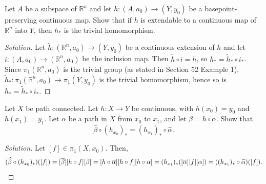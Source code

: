 \documentclass[10pt]{article}
\providecommand{\ol}{\overline}
\providecommand{\RR}{\mathbb R}
\newenvironment{soln}{\begin{proof}[Solution]}{\end{proof}}
\begin{document}
\begin{problem}
    [Munkres 52.5]
    Let $A$ be a subspace of $\RR^n$
    and let $h\colon(A,a_0)\to(Y,y_0)$ be a basepoint-preserving
    continuous map. Show that if $h$ is extendable to
    a continuous map of $\RR^n$ into $Y$,
    then $h_*$ is the trivial homomorphism.
\end{problem}

\begin{soln}
    Let $\widetilde h\colon(\RR^n,a_0)\to(Y,y_0)$ be a continuous extension of $h$
    and let $i\colon(A,a_0)\to(\RR^n,a_0)$ be the inclusion map.
    Then $\tilde h\circ i = h$, so $h_* = \widetilde h_*\circ i_*$.
    Since $\pi_1(\RR^n,a_0)$ is the trivial group
    (as stated in Section 52 Example 1),
    $\widetilde h_*\colon\pi_1(\RR^n,a_0)\to\pi_1(Y,y_0)$
    is the trivial homomorphism, hence so is $h_* = \widetilde h_*\circ i_*$.
\end{soln}

\begin{problem}
    [Munkres 52.6]
    Let $X$ be path connected. Let $h\colon X\to Y$ be continuous,
    with $h(x_0) = y_0$ and $h(x_1) = y_1$.
    Let $\alpha$ be a path in $X$ from $x_0$ to $x_1$,
    and let $\beta = h\circ\alpha$. Show that
    \begin{equation*}
	\widehat\beta\circ(h_{x_0})_* = (h_{x_1})_*\circ\widehat\alpha.
    \end{equation*}
\end{problem}

\begin{soln}
    Let $[f]\in\pi_1(X,x_0)$. Then,
    \begin{equation*}
	(\widehat\beta\circ(h_{x_0})_*)([f]) = [\ol\beta][h\circ f][\beta]
	= [h\circ\ol\alpha][h\circ f][h\circ\alpha]
	= (h_{x_1})_*([\ol\alpha][f][\alpha])
	= ((h_{x_1})_*\circ\widehat\alpha)([f]).\qedhere
    \end{equation*}
\end{soln}
\end{document}
